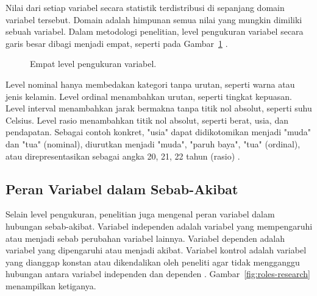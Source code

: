 \documentclass[11pt,a4paper]{article}
\begin{document}
Nilai dari setiap variabel secara statistik terdistribusi di sepanjang domain variabel tersebut. Domain adalah himpunan semua nilai yang mungkin dimiliki sebuah variabel. Dalam metodologi penelitian, level pengukuran variabel secara garis besar dibagi menjadi empat, seperti pada Gambar~\ref{fig:levels} \cite{babbie}.

\begin{figure}[H]
	\centering
	\caption{Empat level pengukuran variabel.}
	\label{fig:levels}
\end{figure}

Level nominal hanya membedakan kategori tanpa urutan, seperti warna atau jenis kelamin. Level ordinal menambahkan urutan, seperti tingkat kepuasan. Level interval menambahkan jarak bermakna tanpa titik nol absolut, seperti suhu Celsius. Level rasio menambahkan titik nol absolut, seperti berat, usia, dan pendapatan. Sebagai contoh konkret, "usia" dapat didikotomikan menjadi "muda" dan "tua" (nominal), diurutkan menjadi "muda", "paruh baya", "tua" (ordinal), atau direpresentasikan sebagai angka 20, 21, 22 tahun (rasio) \cite{wikipedia_research}.

\subsection{Peran Variabel dalam Sebab-Akibat}

Selain level pengukuran, penelitian juga mengenal peran variabel dalam hubungan sebab-akibat. Variabel independen adalah variabel yang mempengaruhi atau menjadi sebab perubahan variabel lainnya. Variabel dependen adalah variabel yang dipengaruhi atau menjadi akibat. Variabel kontrol adalah variabel yang dianggap konstan atau dikendalikan oleh peneliti agar tidak mengganggu hubungan antara variabel independen dan dependen \cite{babbie}. Gambar~\ref{fig:roles-research} menampilkan ketiganya.
\end{document}
